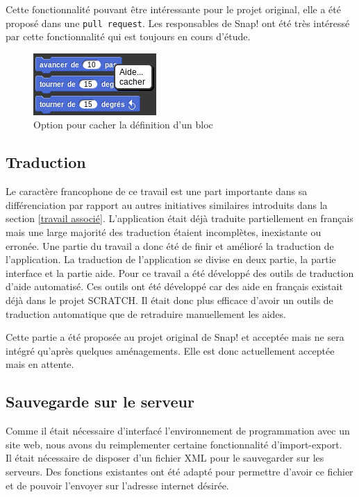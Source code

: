 Cette fonctionnalité pouvant être intéressante pour le projet original, elle a été proposé dans une \texttt{pull request}. Les responsables de Snap! ont été très intéressé par cette fonctionnalité qui est toujours en cours d'étude.
\begin{figure}[ht]
  \begin{center}
    \includegraphics[scale=0.5]{content/7-solution/2-snap/images/cacher}
    \caption{Option pour cacher la définition d'un bloc}
    \label{fig:cacher}
  \end{center}
\end{figure}

\subsection{Traduction}
Le caractère francophone de ce travail est une part importante dans sa différenciation par rapport au autres initiatives similaires introduits dans la section \ref{travail associé}. L'application était déjà traduite partiellement en français mais une large majorité des traduction étaient incomplètes, inexistante ou erronée. Une partie du travail a donc été de finir et amélioré la traduction de l'application. La traduction de l'application se divise en deux partie, la partie interface et la partie aide. Pour ce travail a été développé des outils de traduction d'aide automatisé. Ces outils ont été développé car des aide en français existait déjà dans le projet SCRATCH. Il était donc plus efficace d'avoir un outils de traduction automatique que de retraduire manuellement les aides.

Cette partie a été proposée au projet original de Snap! et acceptée mais ne sera intégré qu'après quelques aménagements. Elle est donc actuellement acceptée mais en attente.

\subsection{Sauvegarde sur le serveur}
Comme il était nécessaire d'interfacé l'environnement de programmation avec un site web, nous avons du reimplementer certaine fonctionnalité d'import-export.\\

Il était nécessaire de disposer d'un fichier XML pour le sauvegarder sur les serveurs. Des fonctions existantes ont été adapté pour permettre d'avoir ce fichier et de pouvoir l'envoyer sur l'adresse internet désirée.

